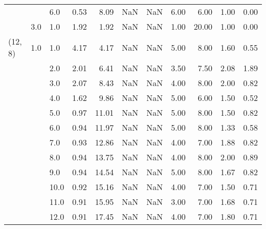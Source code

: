 \begin{tabular}{lllrrrrrrrr}
       &     & 6.0  &      0.53 &       8.09 &               NaN &                NaN & 6.00 &   6.00 &             1.00 &                         0.00 \\
       & 3.0 & 1.0  &      1.92 &       1.92 &               NaN &                NaN & 1.00 &  20.00 &             1.00 &                         0.00 \\
(12, 8) & 1.0 & 1.0  &      4.17 &       4.17 &               NaN &                NaN & 5.00 &   8.00 &             1.60 &                         0.55 \\
       &     & 2.0  &      2.01 &       6.41 &               NaN &                NaN & 3.50 &   7.50 &             2.08 &                         1.89 \\
       &     & 3.0  &      2.07 &       8.43 &               NaN &                NaN & 4.00 &   8.00 &             2.00 &                         0.82 \\
       &     & 4.0  &      1.62 &       9.86 &               NaN &                NaN & 5.00 &   6.00 &             1.50 &                         0.52 \\
       &     & 5.0  &      0.97 &      11.01 &               NaN &                NaN & 5.00 &   8.00 &             1.50 &                         0.82 \\
       &     & 6.0  &      0.94 &      11.97 &               NaN &                NaN & 5.00 &   8.00 &             1.33 &                         0.58 \\
       &     & 7.0  &      0.93 &      12.86 &               NaN &                NaN & 4.00 &   7.00 &             1.88 &                         0.82 \\
       &     & 8.0  &      0.94 &      13.75 &               NaN &                NaN & 4.00 &   8.00 &             2.00 &                         0.89 \\
       &     & 9.0  &      0.94 &      14.54 &               NaN &                NaN & 5.00 &   8.00 &             1.67 &                         0.82 \\
       &     & 10.0 &      0.92 &      15.16 &               NaN &                NaN & 4.00 &   7.00 &             1.50 &                         0.71 \\
       &     & 11.0 &      0.91 &      15.95 &               NaN &                NaN & 3.00 &   7.00 &             1.68 &                         0.71 \\
       &     & 12.0 &      0.91 &      17.45 &               NaN &                NaN & 4.00 &   7.00 &             1.80 &                         0.71 \\

\end{tabular}
